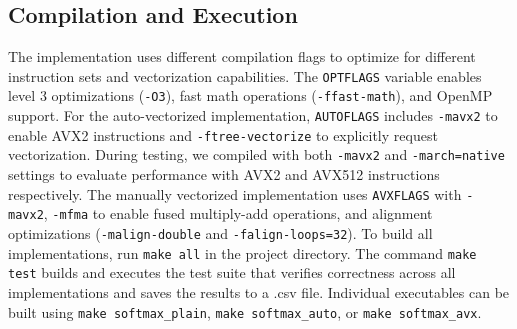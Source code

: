 \documentclass[10pt]{article}
\begin{document}
\subsection{Compilation and Execution}
The implementation uses different compilation flags to optimize for different instruction sets and vectorization capabilities. The \texttt{OPTFLAGS} variable enables level 3 optimizations (\texttt{-O3}), fast math operations (\texttt{-ffast-math}), and OpenMP support. For the auto-vectorized implementation, \texttt{AUTOFLAGS} includes \texttt{-mavx2} to enable AVX2 instructions and \texttt{-ftree-vectorize} to explicitly request vectorization. During testing, we compiled with both \texttt{-mavx2} and \texttt{-march=native} settings to evaluate performance with AVX2 and AVX512 instructions respectively. The manually vectorized implementation uses \texttt{AVXFLAGS} with \texttt{-mavx2}, \texttt{-mfma} to enable fused multiply-add operations, and alignment optimizations (\texttt{-malign-double} and \texttt{-falign-loops=32}). To build all implementations, run \texttt{make all} in the project directory. The command \texttt{make test} builds and executes the test suite that verifies correctness across all implementations and saves the results to a .csv file. Individual executables can be built using \texttt{make softmax\_plain}, \texttt{make softmax\_auto}, or \texttt{make softmax\_avx}.
\end{document}
